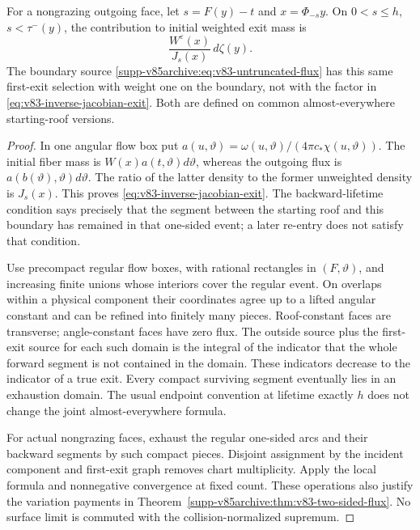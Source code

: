 \begin{proposition}
\label{prop:v83-first-exit-kernel}
For a nongrazing outgoing face, let $s=F(y)-t$ and $x=\Phi_{-s}y$.
On $0<s\le h$, $s<\tau^-(y)$, the contribution to initial weighted
exit mass is
\begin{equation}\label{eq:v83-inverse-jacobian-exit}
                 \frac{W^\varepsilon(x)}{J_s(x)}\,d\zeta(y).
\end{equation}
The boundary source \eqref{supp-v85archive:eq:v83-untruncated-flux} has this same
first-exit selection with weight one on the boundary, not with the
factor in \eqref{eq:v83-inverse-jacobian-exit}. Both are defined on
common almost-everywhere starting-roof versions.
\end{proposition}
\begin{proof}
In one angular flow box put
$a(u,\vartheta)=\omega(u,\vartheta)/(4\pi c_*\chi(u,\vartheta))$.
The initial fiber mass is $W(x)a(t,\vartheta)d\vartheta$, whereas
the outgoing flux is $a(b(\vartheta),\vartheta)d\vartheta$.
The ratio of the latter density to the former unweighted density is
$J_s(x)$. This proves \eqref{eq:v83-inverse-jacobian-exit}. The
backward-lifetime condition says precisely that the segment between
the starting roof and this boundary has remained in that one-sided
event; a later re-entry does not satisfy that condition.

Use precompact regular flow boxes, with rational rectangles in
$(F,\vartheta)$, and increasing finite unions whose interiors cover
the regular event. On overlaps within a physical component their
coordinates agree up to a lifted angular constant and can be refined
into finitely many pieces. Roof-constant faces are transverse;
angle-constant faces have zero flux. The outside source plus the
first-exit source for each such domain is the integral of the
indicator that the whole forward segment is not contained in the
domain. These indicators decrease to the indicator of a true exit.
Every compact surviving segment eventually lies in an exhaustion
domain. The usual endpoint convention at lifetime exactly $h$ does
not change the joint almost-everywhere formula.

For actual nongrazing faces, exhaust the regular one-sided arcs and
their backward segments by such compact pieces. Disjoint assignment
by the incident component and first-exit graph removes chart
multiplicity. Apply the local formula and nonnegative convergence
at fixed count. These operations also justify the variation payments
in Theorem~\ref{supp-v85archive:thm:v83-two-sided-flux}. No surface limit is commuted
with the collision-normalized supremum.
\end{proof}

